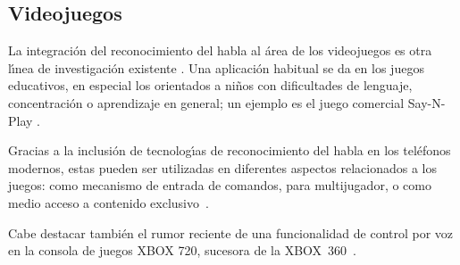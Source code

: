 \subsection{Videojuegos}
\label{sec:videojuegos}

La integraci\'on del reconocimiento del habla al \'area de los videojuegos es otra l{\'\i}nea de
investigaci\'on existente \cite{SporkaNonSpeech2006, JanickiAutomatic2011}. 
Una aplicaci\'on habitual se da en los juegos educativos, en especial los orientados a ni\~nos 
con dificultades de lenguaje, concentraci\'on o aprendizaje en general; un ejemplo es el juego
comercial Say-N-Play \cite{SayNPlay}.

Gracias a la inclusi\'on de tecnolog{\'\i}as de reconocimiento del habla en los tel\'efonos modernos,
estas pueden ser utilizadas en diferentes aspectos relacionados a los juegos: como mecanismo de entrada 
de comandos, para  multijugador, o como medio acceso a contenido 
\mbox{exclusivo \cite{JoselliMobile2009}}.

Cabe destacar tambi\'en el rumor reciente de una funcionalidad de control por voz en
la consola de juegos XBOX 720, sucesora de la \mbox{XBOX 360 \cite{IgnXbox}}.

